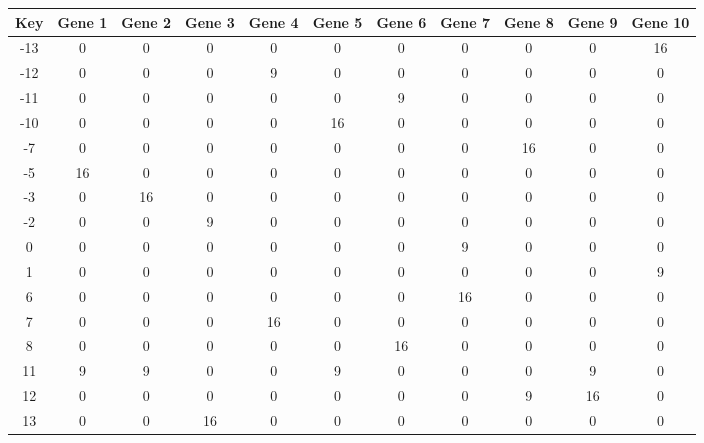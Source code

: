 \begin{tabular}{|c|c|c|c|c|c|c|c|c|c|c|}
\hline
Key & Gene 1 & Gene 2 & Gene 3 & Gene 4 & Gene 5 & Gene 6 & Gene 7 & Gene 8 & Gene 9 & Gene 10 \\
\hline
-13 & 0 & 0 & 0 & 0 & 0 & 0 & 0 & 0 & 0 & 16 \\
-12 & 0 & 0 & 0 & 9 & 0 & 0 & 0 & 0 & 0 & 0 \\
-11 & 0 & 0 & 0 & 0 & 0 & 9 & 0 & 0 & 0 & 0 \\
-10 & 0 & 0 & 0 & 0 & 16 & 0 & 0 & 0 & 0 & 0 \\
-7 & 0 & 0 & 0 & 0 & 0 & 0 & 0 & 16 & 0 & 0 \\
-5 & 16 & 0 & 0 & 0 & 0 & 0 & 0 & 0 & 0 & 0 \\
-3 & 0 & 16 & 0 & 0 & 0 & 0 & 0 & 0 & 0 & 0 \\
-2 & 0 & 0 & 9 & 0 & 0 & 0 & 0 & 0 & 0 & 0 \\
0 & 0 & 0 & 0 & 0 & 0 & 0 & 9 & 0 & 0 & 0 \\
1 & 0 & 0 & 0 & 0 & 0 & 0 & 0 & 0 & 0 & 9 \\
6 & 0 & 0 & 0 & 0 & 0 & 0 & 16 & 0 & 0 & 0 \\
7 & 0 & 0 & 0 & 16 & 0 & 0 & 0 & 0 & 0 & 0 \\
8 & 0 & 0 & 0 & 0 & 0 & 16 & 0 & 0 & 0 & 0 \\
11 & 9 & 9 & 0 & 0 & 9 & 0 & 0 & 0 & 9 & 0 \\
12 & 0 & 0 & 0 & 0 & 0 & 0 & 0 & 9 & 16 & 0 \\
13 & 0 & 0 & 16 & 0 & 0 & 0 & 0 & 0 & 0 & 0 \\
\hline
\end{tabular}